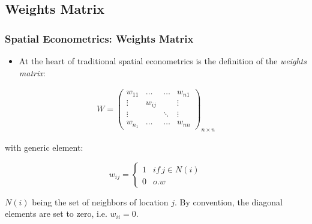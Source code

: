 \documentclass[
  shownotes,
  xcolor={svgnames},
  hyperref={colorlinks,citecolor=DarkBlue,linkcolor=DarkRed,urlcolor=DarkBlue}
   , aspectratio=169]{beamer}
\begin{document}
\subsection{Weights Matrix}
\begin{frame}[fragile]
\frametitle{Spatial Econometrics: Weights Matrix}

\begin{itemize}
  \item At the heart of traditional spatial econometrics is the definition of the {\it weights matrix}:
\end{itemize}


\begin{align}
W=\left(\begin{array}{cccc}
w_{11} & \dots & \dots & w_{n1}\\
\vdots & w_{ij} &  & \vdots\\
\vdots &  & \ddots & \vdots\\
w_{n_{1}} & \dots & \dots & w_{nn}
\end{array}\right)_{n\times n}
\end{align}

with generic element:

\begin{equation}
w_{ij}=\begin{cases}
1 & if\,j\in N\left(i\right)\\
0 & o.w
\end{cases}
\end{equation}

$N(i)$ being the set of neighbors of location $j$. By convention, the diagonal elements are set to zero, i.e. $w_{ii}=0$. 

\end{frame}
\end{document}
